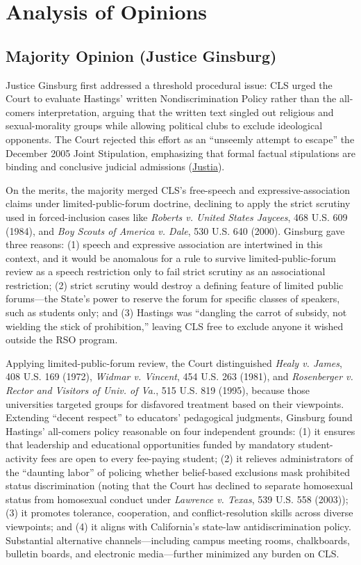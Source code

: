 \documentclass[12pt]{article}
\begin{document}
\section{Analysis of Opinions}

\subsection{Majority Opinion (Justice Ginsburg)}

Justice Ginsburg first addressed a threshold procedural issue: CLS urged the Court to evaluate Hastings' written Nondiscrimination Policy rather than the all-comers interpretation, arguing that the written text singled out religious and sexual-morality groups while allowing political clubs to exclude ideological opponents. The Court rejected this effort as an ``unseemly attempt to escape'' the December 2005 Joint Stipulation, emphasizing that formal factual stipulations are binding and conclusive judicial admissions (\href{https://supreme.justia.com/cases/federal/us/561/661/}{Justia}).

On the merits, the majority merged CLS's free-speech and expressive-association claims under limited-public-forum doctrine, declining to apply the strict scrutiny used in forced-inclusion cases like \textit{Roberts v. United States Jaycees}, 468 U.S. 609 (1984), and \textit{Boy Scouts of America v. Dale}, 530 U.S. 640 (2000). Ginsburg gave three reasons: (1) speech and expressive association are intertwined in this context, and it would be anomalous for a rule to survive limited-public-forum review as a speech restriction only to fail strict scrutiny as an associational restriction; (2) strict scrutiny would destroy a defining feature of limited public forums---the State's power to reserve the forum for specific classes of speakers, such as students only; and (3) Hastings was ``dangling the carrot of subsidy, not wielding the stick of prohibition,'' leaving CLS free to exclude anyone it wished outside the RSO program.

Applying limited-public-forum review, the Court distinguished \textit{Healy v. James}, 408 U.S. 169 (1972), \textit{Widmar v. Vincent}, 454 U.S. 263 (1981), and \textit{Rosenberger v. Rector and Visitors of Univ. of Va.}, 515 U.S. 819 (1995), because those universities targeted groups for disfavored treatment based on their viewpoints. Extending ``decent respect'' to educators' pedagogical judgments, Ginsburg found Hastings' all-comers policy reasonable on four independent grounds: (1) it ensures that leadership and educational opportunities funded by mandatory student-activity fees are open to every fee-paying student; (2) it relieves administrators of the ``daunting labor'' of policing whether belief-based exclusions mask prohibited status discrimination (noting that the Court has declined to separate homosexual status from homosexual conduct under \textit{Lawrence v. Texas}, 539 U.S. 558 (2003)); (3) it promotes tolerance, cooperation, and conflict-resolution skills across diverse viewpoints; and (4) it aligns with California's state-law antidiscrimination policy. Substantial alternative channels---including campus meeting rooms, chalkboards, bulletin boards, and electronic media---further minimized any burden on CLS.
\end{document}
